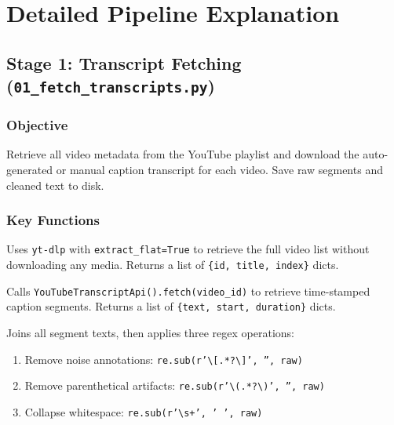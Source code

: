 \documentclass[11pt,a4paper]{article}
\begin{document}
\section{Detailed Pipeline Explanation}

\subsection{Stage 1: Transcript Fetching (\texttt{01\_fetch\_transcripts.py})}

\subsubsection{Objective}

Retrieve all video metadata from the YouTube playlist and download the auto-generated or manual caption transcript for each video. Save raw segments and cleaned text to disk.

\subsubsection{Key Functions}

\begin{description}[leftmargin=1.5em, labelindent=0em]
    \item[\texttt{get\_playlist\_videos(playlist\_id)}] Uses \texttt{yt-dlp} with \texttt{extract\_flat=True} to retrieve the full video list without downloading any media. Returns a list of \texttt{\{id, title, index\}} dicts.

    \item[\texttt{fetch\_transcript(video\_id)}] Calls \texttt{YouTubeTranscriptApi().fetch(video\_id)} to retrieve time-stamped caption segments. Returns a list of \texttt{\{text, start, duration\}} dicts.

    \item[\texttt{clean\_transcript(segments)}] Joins all segment texts, then applies three regex operations:
    \begin{enumerate}[leftmargin=1em]
        \item Remove noise annotations: \texttt{re.sub(r'\textbackslash[.*?\textbackslash]', '', raw)}
        \item Remove parenthetical artifacts: \texttt{re.sub(r'\textbackslash(.*?\textbackslash)', '', raw)}
        \item Collapse whitespace: \texttt{re.sub(r'\textbackslash s+', ' ', raw)}
    \end{enumerate}
\end{description}
\end{document}
